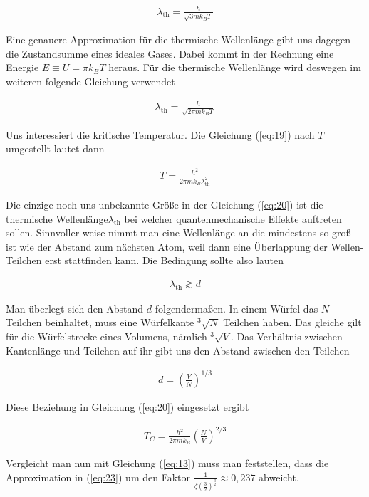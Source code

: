\begin{align}
  \label{eq:18}
  \lambda_{\text{th}} = \frac{h}{\sqrt{3mk_B T}}
\end{align}

Eine genauere Approximation für die thermische Wellenlänge gibt uns dagegen die Zustandsumme eines ideales Gases. Dabei kommt in der Rechnung eine Energie \(E\equiv U=\pi k_B T \) heraus. Für die thermische Wellenlänge wird deswegen im weiteren folgende Gleichung verwendet

\begin{align}
  \label{eq:19}
  \boxed{ \lambda_{\text{th}} = \frac{h}{\sqrt{2\pi mk_B T}} }
\end{align}

Uns interessiert die kritische Temperatur. Die Gleichung (\ref{eq:19}) nach \(T\) umgestellt lautet dann

\begin{align}
  \label{eq:20}
  T = \frac{h^2}{2\pi mk_B \lambda^2_{\text{th}}}
\end{align}

Die einzige noch uns unbekannte Größe in der Gleichung (\ref{eq:20}) ist die thermische Wellenlänge\(\lambda_{\text{th}}\) bei welcher quantenmechanische Effekte auftreten sollen. Sinnvoller weise nimmt man eine Wellenlänge an die mindestens so groß ist wie der Abstand zum nächsten Atom, weil dann eine Überlappung der Wellen-Teilchen erst stattfinden kann. Die Bedingung sollte also lauten

\begin{align}
  \label{eq:21}
  \lambda_{\text{th}} \gtrsim d
\end{align}

Man überlegt sich den Abstand \(d\) folgendermaßen. In einem Würfel das \(N\)-Teilchen beinhaltet, muss eine Würfelkante \(^3\sqrt{N}\) Teilchen haben. Das gleiche gilt für die Würfelstrecke eines Volumens, nämlich \(^3\sqrt{V}\). Das Verhältnis zwischen Kantenlänge und Teilchen auf ihr gibt uns den Abstand zwischen den Teilchen

\begin{align}
  \label{eq:22}
  d = \left( \frac{V}{N}\right)^{1/3}
\end{align}

Diese Beziehung in Gleichung (\ref{eq:20}) eingesetzt ergibt 

\begin{align}
  \label{eq:23}
  T_C = \frac{h^2}{2\pi mk_B} \left( \frac{N}{V}\right)^{2/3}
\end{align}

Vergleicht man nun mit Gleichung (\ref{eq:13}) muss man feststellen, dass die Approximation in (\ref{eq:23}) um den Faktor \(\frac{1}{\zeta(\frac{3}{2})^{\frac{3}{2}}}\approx 0,237 \) abweicht.




